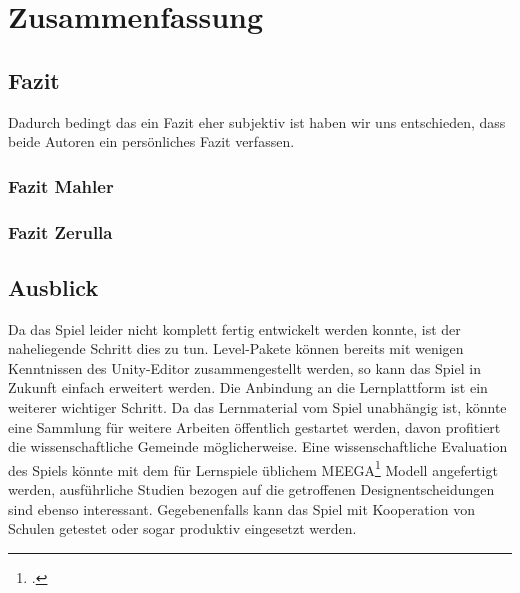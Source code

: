 \section{Zusammenfassung}
\subsection{Fazit}
	Dadurch bedingt das ein Fazit eher subjektiv ist haben wir uns entschieden, dass beide Autoren ein persönliches Fazit verfassen.
	\subsubsection{Fazit Mahler}
	\subsubsection{Fazit Zerulla}
\subsection{Ausblick}
	Da das Spiel leider nicht komplett fertig entwickelt werden konnte, ist der naheliegende Schritt dies zu tun. Level-Pakete können bereits mit wenigen Kenntnissen des Unity-Editor zusammengestellt werden, so kann das Spiel in Zukunft einfach erweitert werden. Die Anbindung an die Lernplattform ist ein weiterer wichtiger Schritt.
	Da das Lernmaterial vom Spiel unabhängig ist, könnte eine Sammlung für weitere Arbeiten öffentlich gestartet werden, davon profitiert die wissenschaftliche Gemeinde möglicherweise.
	Eine wissenschaftliche Evaluation des Spiels könnte mit dem für Lernspiele üblichem MEEGA\footcite{psych1} Modell angefertigt werden, ausführliche Studien bezogen auf die getroffenen Designentscheidungen sind ebenso interessant.
	Gegebenenfalls kann das Spiel mit Kooperation von Schulen getestet oder sogar produktiv eingesetzt werden.
